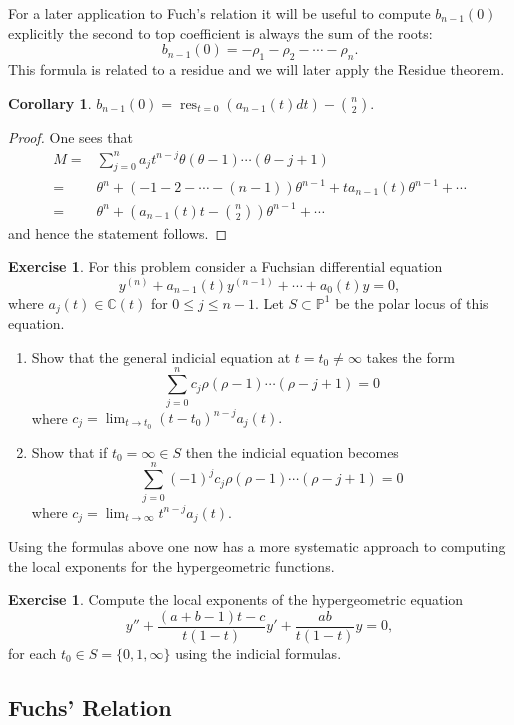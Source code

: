 \documentclass[12pt]{book}
\numberwithin{equation}{section}
\newtheorem{corollary}[theorem]{Corollary}
\theoremstyle{definition}
\newtheorem{exercise}[theorem]{Exercise}
\theoremstyle{remark}
\newcommand{\CC}{\mathbb{C}}
\newcommand{\PP}{\mathbb{P}}
\newcommand{\res}{\operatorname{res}}
\begin{document}
For a later application to Fuch's relation it will be useful to compute $b_{n-1}(0)$ explicitly the second to top coefficient is always the sum of the roots:
 $$ b_{n-1}(0) = -\rho_1 -\rho_2 - \cdots - \rho_n.$$
This formula is related to a residue and we will later apply the Residue theorem.
\begin{corollary}\label{C:residue-formula}
	 $ b_{n-1}(0) = \res_{t=0}( a_{n-1}(t)dt ) - {n \choose 2}.$
\end{corollary}
\begin{proof}
One sees that 
\begin{align*}
M =& \sum_{j=0}^n a_j t^{n-j} \theta(\theta-1)\cdots(\theta-j+1) \\
=& \theta^n + (-1-2-\cdots-(n-1))\theta^{n-1} + ta_{n-1}(t) \theta^{n-1} + \cdots \\
=& \theta^n + \left( a_{n-1}(t)t - {n \choose 2} \right)\theta^{n-1} + \cdots  
\end{align*}
and hence the statement follows.
\end{proof}

\begin{exercise}
	For this problem consider a Fuchsian differential equation 
	 $$ y^{(n)} + a_{n-1}(t) y^{(n-1)} + \cdots + a_0(t) y =0,$$
	where $a_j(t) \in \CC(t)$ for $0\leq j \leq n-1$.
	Let $S\subset \PP^1$ be the polar locus of this equation. 
	\begin{enumerate}
		\item Show that the general indicial equation at $t=t_0\neq \infty$ takes the form
		 $$ \sum_{j=0}^n c_j \rho(\rho-1)\cdots(\rho-j+1) =0 $$
		where $c_j = \lim_{t\to t_0} (t-t_0)^{n-j}a_j(t).$
		\item Show that if $t_0=\infty \in S$ then the indicial equation becomes 
		 $$ \sum_{j=0}^n (-1)^j c_j \rho(\rho-1)\cdots(\rho-j+1) =0 $$
		 where $c_j = \lim_{t\to \infty} t^{n-j} a_j(t)$. 
	\end{enumerate}
\end{exercise}
Using the formulas above one now has a more systematic approach to computing the local exponents for the hypergeometric functions. 
\begin{exercise}
	Compute the local exponents of the hypergeometric equation 
	 $$ y'' + \dfrac{(a+b-1)t -c}{t(1-t)}y' + \dfrac{ab}{t(1-t)} y =0, $$
	for each $t_0 \in S = \lbrace 0,1,\infty\rbrace$ using the indicial formulas. 
\end{exercise}


\subsection{Fuchs' Relation}
\end{document}
